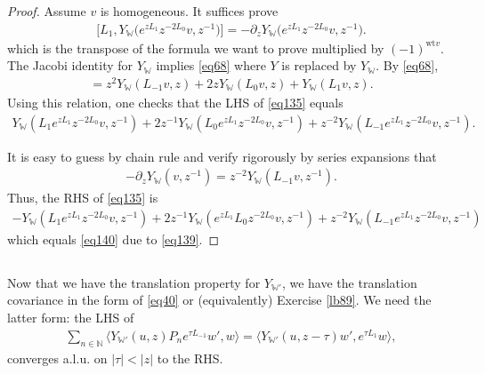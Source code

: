 \documentclass[11pt,b5paper,notitlepage]{article}
\theoremstyle{definition}
\theoremstyle{plain}
\newcommand{\bigbk}[1]{\big\langle {#1}\big\rangle}
\newcommand{\Wbb}{\mathbb W}
\newcommand{\Nbb}{\mathbb N}
\newcommand{\wt}{\mathrm{wt}}
\numberwithin{equation}{section}
\begin{document}
\begin{proof}
Assume $v$ is homogeneous. It suffices prove 
\begin{align}
\big[L_1,Y_\Wbb\big(e^{zL_1}z^{-2L_0}v,z^{-1}\big)\big]=-\partial_zY_\Wbb\big(e^{zL_1}z^{-2L_0}v,z^{-1}\big).\label{eq135}	
\end{align}
which is the transpose of the formula we want to prove multiplied by $(-1)^{\wt v}$. The Jacobi identity for $Y_\Wbb$ implies \eqref{eq68} where $Y$ is replaced by $Y_\Wbb$. By \eqref{eq68},
\begin{align}
	[L_1,Y_\Wbb(v,z)]=z^2Y_\Wbb(L_{-1}v,z)+2zY_\Wbb(L_0v,z)+Y_\Wbb(L_1v,z).	
\end{align}
Using this relation, one checks that the LHS of \eqref{eq135} equals
\begin{align}
Y_\Wbb(L_1e^{zL_1}z^{-2L_0}v,z^{-1})+2z^{-1}Y_\Wbb(L_0e^{zL_1}z^{-2L_0}v,z^{-1})+z^{-2}Y_\Wbb(L_{-1}e^{zL_1}z^{-2L_0}v,z^{-1}).\label{eq140}	
\end{align}

It is easy to guess by chain rule and verify rigorously by series expansions that
\begin{align*}
-\partial_z Y_\Wbb(v,z^{-1})=z^{-2}Y_\Wbb(L_{-1}v,z^{-1}).	
\end{align*}
Thus, the RHS of \eqref{eq135} is
\begin{align*}
-Y_\Wbb(L_1e^{zL_1}z^{-2L_0}v,z^{-1})+2z^{-1}Y_\Wbb(e^{zL_1}L_0z^{-2L_0}v,z^{-1})+z^{-2}Y_\Wbb(L_{-1}e^{zL_1}z^{-2L_0}v,z^{-1})
\end{align*}
which equals \eqref{eq140} due to \eqref{eq139}.
\end{proof}




\subsection{}


Now that we have the translation property for $Y_{\Wbb'}$, we have the translation covariance in the form of \eqref{eq40} or (equivalently) Exercise \ref{lb89}. We need the latter form: the LHS of 
\begin{align}
	\sum_{n\in\Nbb}\bigbk{Y_{\Wbb'}(u,z)P_ne^{\tau L_{-1}}w',w}=\bigbk{Y_{\Wbb'}(u,z-\tau)w',e^{\tau L_1}w},\label{eq150}
\end{align}
converges a.l.u. on $|\tau|<|z|$ to the RHS.
\end{document}
